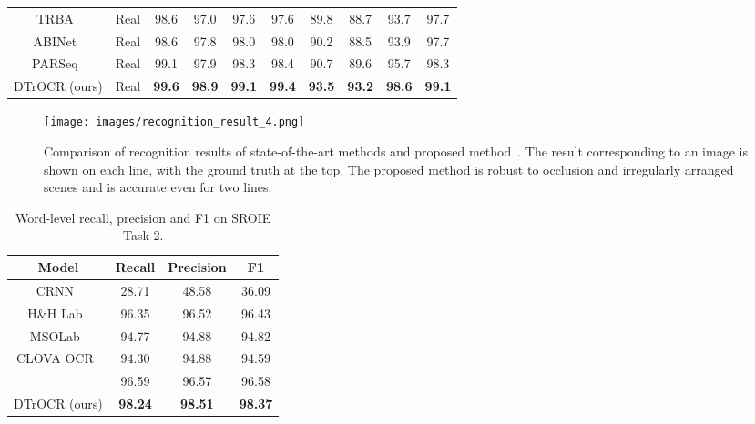 \documentclass[10pt,twocolumn,letterpaper]{article}
\begin{document}
\begin{table*}[tb]
\begin{tabular}{cccccccccc}
TRBA~\cite{baek2021TRBA, bautista2022parseq} & Real &98.6 & 97.0 & 97.6 & 97.6 & 89.8 & 88.7 & 93.7 & 97.7 \\
ABINet~\cite{fang2021ABINet, bautista2022parseq} & Real & 98.6 & 97.8 & 98.0 & 98.0 & 90.2 & 88.5 & 93.9 & 97.7 \\

PARSeq~\cite{bautista2022parseq} & Real& 99.1 & 97.9 & 98.3 & 98.4 & 90.7 & 89.6 & 95.7 & 98.3 \\
DTrOCR (ours) & Real & \textbf{99.6} & \textbf{98.9} & \textbf{99.1} & \textbf{99.4} & \textbf{93.5} & \textbf{93.2} & \textbf{98.6} & \textbf{99.1} \\


\bottomrule

\end{tabular}
\end{table*}

\begin{figure}[htp]
	\centering
	\texttt{[image: images/recognition\_result\_4.png]}
	\caption{
Comparison of recognition results of state-of-the-art methods and proposed method~\cite{fang2021ABINet, bautista2022parseq}.
The result corresponding to an image is shown on each line, with the ground truth at the top.
The proposed method is robust to occlusion and irregularly arranged scenes and is accurate even for two lines.
}
	\label{fig:recognition_result}
\end{figure}


\begin{table}[ht]
\centering
\caption{Word-level recall, precision and F1 on SROIE Task 2.
}
\label{tab:method_overall_result_sroie}
\begin{tabular}{cccc}
\toprule
Model & Recall & Precision & F1 \\ \midrule
CRNN~\cite{shi2016crnn}            & 28.71              & 48.58          & 36.09         \\
H\&H Lab~\cite{huang2019sroie} & 96.35           & 96.52              & 96.43       \\
MSOLab~\cite{huang2019sroie}   & 94.77           & 94.88              & 94.82       \\
CLOVA OCR~\cite{huang2019sroie} & 94.30            & 94.88              & 94.59       \\
~\cite{li2021trocr}     & 96.59           & 96.57              & 96.58       \\
\hline
DTrOCR (ours) & \textbf{98.24}            & \textbf{98.51}              & \textbf{98.37}       \\
\bottomrule
\end{tabular}
\end{table}
\end{document}
